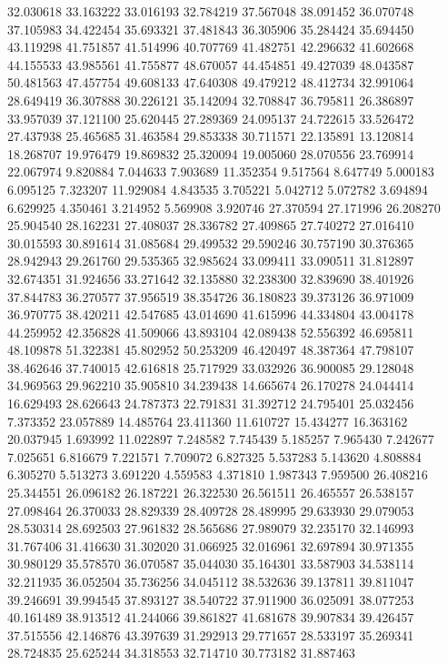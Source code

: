 32.030618
33.163222
33.016193
32.784219
37.567048
38.091452
36.070748
37.105983
34.422454
35.693321
37.481843
36.305906
35.284424
35.694450
43.119298
41.751857
41.514996
40.707769
41.482751
42.296632
41.602668
44.155533
43.985561
41.755877
48.670057
44.454851
49.427039
48.043587
50.481563
47.457754
49.608133
47.640308
49.479212
48.412734
32.991064
28.649419
36.307888
30.226121
35.142094
32.708847
36.795811
26.386897
33.957039
37.121100
25.620445
27.289369
24.095137
24.722615
33.526472
27.437938
25.465685
31.463584
29.853338
30.711571
22.135891
13.120814
18.268707
19.976479
19.869832
25.320094
19.005060
28.070556
23.769914
22.067974
9.820884
7.044633
7.903689
11.352354
9.517564
8.647749
5.000183
6.095125
7.323207
11.929084
4.843535
3.705221
5.042712
5.072782
3.694894
6.629925
4.350461
3.214952
5.569908
3.920746
27.370594
27.171996
26.208270
25.904540
28.162231
27.408037
28.336782
27.409865
27.740272
27.016410
30.015593
30.891614
31.085684
29.499532
29.590246
30.757190
30.376365
28.942943
29.261760
29.535365
32.985624
33.099411
33.090511
31.812897
32.674351
31.924656
33.271642
32.135880
32.238300
32.839690
38.401926
37.844783
36.270577
37.956519
38.354726
36.180823
39.373126
36.971009
36.970775
38.420211
42.547685
43.014690
41.615996
44.334804
43.004178
44.259952
42.356828
41.509066
43.893104
42.089438
52.556392
46.695811
48.109878
51.322381
45.802952
50.253209
46.420497
48.387364
47.798107
38.462646
37.740015
42.616818
25.717929
33.032926
36.900085
29.128048
34.969563
29.962210
35.905810
34.239438
14.665674
26.170278
24.044414
16.629493
28.626643
24.787373
22.791831
31.392712
24.795401
25.032456
7.373352
23.057889
14.485764
23.411360
11.610727
15.434277
16.363162
20.037945
1.693992
11.022897
7.248582
7.745439
5.185257
7.965430
7.242677
7.025651
6.816679
7.221571
7.709072
6.827325
5.537283
5.143620
4.808884
6.305270
5.513273
3.691220
4.559583
4.371810
1.987343
7.959500
26.408216
25.344551
26.096182
26.187221
26.322530
26.561511
26.465557
26.538157
27.098464
26.370033
28.829339
28.409728
28.489995
29.633930
29.079053
28.530314
28.692503
27.961832
28.565686
27.989079
32.235170
32.146993
31.767406
31.416630
31.302020
31.066925
32.016961
32.697894
30.971355
30.980129
35.578570
36.070587
35.044030
35.164301
33.587903
34.538114
32.211935
36.052504
35.736256
34.045112
38.532636
39.137811
39.811047
39.246691
39.994545
37.893127
38.540722
37.911900
36.025091
38.077253
40.161489
38.913512
41.244066
39.861827
41.681678
39.907834
39.426457
37.515556
42.146876
43.397639
31.292913
29.771657
28.533197
35.269341
28.724835
25.625244
34.318553
32.714710
30.773182
31.887463
